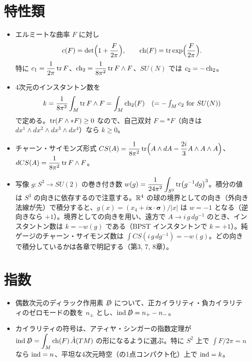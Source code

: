 \section*{特性類}
\begin{itemize}
  \item エルミートな曲率 $F$ に対し
  \[
  c(F)=\det\Bigl(1+\frac{F}{2\pi}\Bigr),\qquad \operatorname{ch}(F)=\tr\exp\Bigl(\frac{F}{2\pi}\Bigr).
  \]
  特に $c_1=\dfrac{1}{2\pi}\tr F$、$\operatorname{ch}_2=\dfrac{1}{8\pi^2}\tr F\wedge F$、$SU(N)$ では $c_2=-\operatorname{ch}_2$。
  \item 4次元のインスタントン数を
  \[
  k=\frac{1}{8\pi^2}\int_M\tr F\wedge F=\int_M\operatorname{ch}_2(F)\quad(=-\textstyle\int_Mc_2\ \text{for}\ SU(N))
  \]
  で定める。$\tr(F\wedge *F)\ge0$ なので、自己双対 $F=*F$（向きは $dx^1\wedge dx^2\wedge dx^3\wedge dx^4$）なら $k\ge0$。
  \item チャーン・サイモンズ形式 $\displaystyle CS(A)=\frac{1}{8\pi^2}\tr\Bigl(A\wedge dA-\frac{2i}{3}A\wedge A\wedge A\Bigr)$、$dCS(A)=\dfrac{1}{8\pi^2}\tr F\wedge F$。
  \item 写像 $g\colon S^3\to SU(2)$ の巻き付き数 $\displaystyle w(g)=\frac{1}{24\pi^2}\int_{S^3}\tr(g^{-1}dg)^3$。積分の値は $S^3$ の向きに依存するので注意する。$\mathbb{R}^4$ の球の境界としての向き（外向き法線が先）で積分すると、$g(x)=(x_4+i\bm{x}\cdot\bm{\sigma})/\lvert x\rvert$ は $w=-1$ となる（逆向きなら $+1$）。境界としての向きを用い、遠方で $A\to i\,g\,dg^{-1}$ のとき、インスタントン数は $k=-w(g)$ である（BPST インスタントンで $k=+1$）。純ゲージのチャーン・サイモンズ数は $\int CS(i\,g\,dg^{-1})=-w(g)$。どの向きで積分しているかは各章で明記する（第3, 7, 8章）。
\end{itemize}

\section*{指数}
\begin{itemize}
  \item 偶数次元のディラック作用素 $\slashed{D}$ について、正カイラリティ・負カイラリティのゼロモードの数を $n_\pm$ とし、$\operatorname{ind}\slashed{D}=n_+-n_-$。
  \item カイラリティの符号は、アティヤ・シンガーの指数定理が $\displaystyle\operatorname{ind}\slashed{D}=\int_M\operatorname{ch}(F)\,\hat{A}(TM)$ の形になるように選ぶ。特に $S^2$ 上で $\int F/2\pi=n$ なら $\operatorname{ind}=n$、平坦な4次元時空（の1点コンパクト化）上で $\operatorname{ind}=k$。
\end{itemize}

\mainmatter












